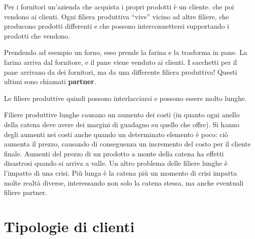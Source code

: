 \noindent Per i fornitori un'azienda che acquista i propri prodotti è un
cliente.  che poi vendono ai
clienti. Ogni filiera produttiva ``vive'' vicino ad altre filiere, che producono
prodotti differenti e che possono interconnettersi supportando i prodotti che
vendono.

\begin{example}[Forno]
Prendendo ad esempio un forno, esso prende la farina e la trasforma in pane. La
farina arriva dal fornitore, e il pane viene venduto ai clienti. I sacchetti
per il pane arrivano da dei fornitori, ma da una differente filiera produttiva!
Questi ultimi sono chiamati \textbf{partner}.
\end{example}

\noindent Le filiere produttive quindi possono interlacciarsi e possono essere
molto lunghe.

Filiere produttive lunghe causano un aumento dei costi (in quanto ogni anello
della catena deve avere dei margini di guadagno su quello che offre). Si hanno
degli aumenti nei costi anche quando un determinato elemento è poco: ciò
aumenta il prezzo, causando di conseguenza un incremento del costo per il
cliente finale. Aumenti del prezzo di un prodotto a monte della catena ha
effetti disastrosi quando si arriva a valle. Un altro problema delle filiere
lunghe è l'impatto di una crisi. Più lunga è la catena più un momento di crisi
impatta molte realtà diverse, interessando non solo la catena stessa, ma anche
eventuali filiere partner.

\section{Tipologie di clienti}

